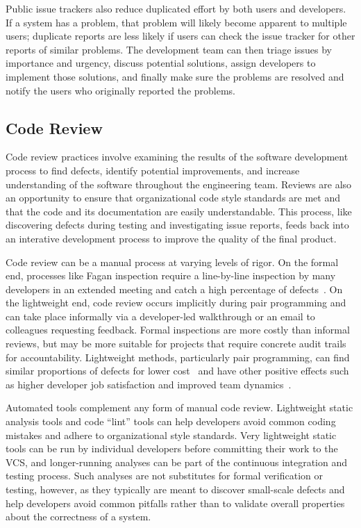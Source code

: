 Public issue trackers also reduce duplicated effort by both users and
developers. If a system has a problem, that problem will likely become
apparent to multiple users; duplicate reports are less likely if users
can check the issue tracker for other reports of similar problems. The
development team can then triage issues by importance and urgency,
discuss potential solutions, assign developers to implement those
solutions, and finally make sure the problems are resolved and notify
the users who originally reported the problems.

\subsection{Code Review}

Code review practices involve examining the results of the software
development process to find defects, identify potential improvements,
and increase understanding of the software throughout the engineering
team. Reviews are also an opportunity to ensure that organizational
code style standards are met and that the code and its documentation
are easily understandable. This process, like discovering defects
during testing and investigating issue reports, feeds back into an
interative development process to improve the quality of the final
product.

Code review can be a manual process at varying levels of rigor. On the
formal end, processes like Fagan inspection require a line-by-line
inspection by many developers in an extended meeting and catch a high
percentage of defects~\cite{fagan2002design}. On the lightweight end,
code review occurs implicitly during pair programming and can take
place informally via a developer-led walkthrough or an email to
colleagues requesting feedback. Formal inspections are more costly
than informal reviews, but may be more suitable for projects that
require concrete audit trails for accountability. Lightweight methods,
particularly pair programming, can find similar proportions of defects
for lower cost~\cite{tomayko2002comparison} and have other positive
effects such as higher developer job satisfaction and improved team
dynamics~\cite{cockburn2000costs}.

Automated tools complement any form of manual code review. Lightweight
static analysis tools and code ``lint'' tools can help developers
avoid common coding mistakes and adhere to organizational style
standards. Very lightweight static tools can be run by individual
developers before committing their work to the VCS, and longer-running
analyses can be part of the continuous integration and testing
process. Such analyses are not substitutes for formal verification or
testing, however, as they typically are meant to discover small-scale
defects and help developers avoid common pitfalls rather than to
validate overall properties about the correctness of a system.

